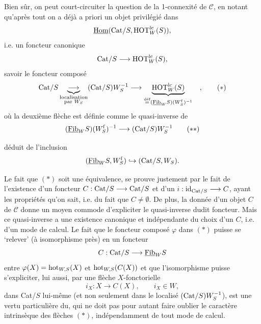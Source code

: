 Bien sûr, on peut court-circuiter la question de la 1-connexité de $\mathcal{C}$, en notant qu'après tout on a déjà a priori un objet privilégié dans
\[
\underline{\mathrm{Hom}}(\mathrm{Cat}/S, \mathrm{HOT}^{\mathrm{lc}}_W(S)),
\]
i.e. un foncteur canonique
\[
\mathrm{Cat}/S \longrightarrow \mathrm{HOT}^{\mathrm{lc}}_W(S),
\]
savoir le foncteur composé
\[
\Cat/S \underbrace{\longrightarrow}_{\substack{\text{localisation}\\ \text{par } W_S}} (\Cat/S)W_S^{-1} \longrightarrow \underbrace{\HOT^{\mathrm{lc}}_W(S)}_{\overset{\text{déf}}{=} (\Fib_W S)(W^{\mathrm{f}}_S)^{-1}} \quad ,
\tag*{$(*)$}
\]
où la deuxième flèche est définie comme le quasi-inverse de
\[
(\Fib_W S)(W^{\mathrm{f}}_S)^{-1} \longrightarrow (\Cat/S)W_S^{-1}
\tag*{$(**)$}
\]

déduit de l'inclusion
\[
(\underline{\mathrm{Fib}}_W S, W^{\mathrm{f}}_S) \hookrightarrow (\mathrm{Cat}/S, W_S).
\]

Le fait que $(*)$ soit une équivalence, se prouve justement par le fait de l'existence d'un foncteur $C : \mathrm{Cat}/S \longrightarrow \mathrm{Cat}/S$ et d'un $i : \mathrm{id}_{\mathrm{Cat}/S} \longrightarrow C$, ayant les propriétés qu'on sait, i.e. du fait que $C \neq \emptyset$. De plus, la donnée d'un objet $C$ de $\mathcal{C}$ donne un moyen commode d'expliciter le quasi-inverse dudit foncteur. Mais ce quasi-inverse a une existence canonique et indépendante du choix d'un $C$, i.e. d'un mode de calcul. Le fait que le foncteur composé $\varphi$ dans $(*)$ puisse se ‘relever’ (à isomorphisme près) en un foncteur %
\[
C : \mathrm{Cat}/S \longrightarrow \underline{\mathrm{Fib}}_W S
\]
entre $\varphi(X) = \mathrm{hot}_{W,S}(X)$ et $\mathrm{hot}_{W,S}(C(X))$ et que l'isomorphisme puisse s'expliciter, lui aussi, par une flèche $X$-fonctorielle
\[
i_X : X \longrightarrow C(X), \qquad i_X \in W,
\]
dans Cat/$S$ lui-même (et non seulement dans le localisé $(\mathrm{Cat}/S)W_S^{-1}$),
est une vertu particulière du, qui ne doit pas pour autant faire oublier le caractère intrinsèque des flèches $(*)$, indépendamment de tout mode de calcul.

